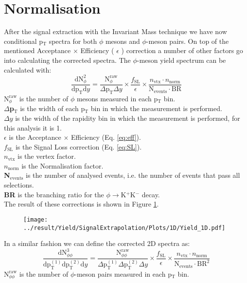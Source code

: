 \section{Normalisation}
\label{sec:Normalisation}
After the signal extraction with the Invariant Mass technique we have now conditional p$_{\text{T}}$ spectra for both $\phi$ mesons and $\phi$-meson pairs. On top of the mentioned Acceptance $\times$ Efficiency ( $\epsilon$ ) correction a number of other factors go into calculating the corrected spectra. The $\phi$-meson yield spectrum can be calculated with:
\begin{equation}
\frac{\text{dN}^2_{\phi}}{\text{dp}_{\text{T}}\text{d}y} = \frac{\text{N}_{\phi}^{\text{raw}}}{\Delta\text{p}_{\text{T}}\Delta y} \times \frac{f_{\text{SL}}}{\epsilon} \times \frac{n_{\text{vtx}}\cdot n_{\text{norm}}}{\text{N}_{\text{events}}\cdot \text{BR}}
\label{eq:1Dcorr}
\end{equation}
\textbf{$\text{N}_{\phi}^{\text{raw}}$} is the number of $\phi$ mesons measured in each p$_{\text{T}}$ bin.\\
\textbf{$\Delta$p$_{\text{T}}$} is the width of each p$_{\text{T}}$ bin in which the measurement is performed.\\
\textbf{$\Delta y$} is the width of the rapidity bin in which the measurement is performed, for this analysis it is 1.\\
\textbf{$\epsilon$} is the Acceptance $\times$ Efficiency (Eq. \ref{eq:eff}).\\
\textbf{$f_{\text{SL}}$} is the Signal Loss correction (Eq. \ref{eq:SL}).\\
\textbf{$n_{\text{vtx}}$} is the vertex factor.\\
\textbf{$n_{\text{norm}}$} is the Normalisation factor.\\
\textbf{N$_{\text{events}}$} is the number of analysed events, i.e. the number of events that pass all selections.\\
\textbf{BR} is the branching ratio for the $\phi \to$K$^+$K$^-$ decay.\\
\indent The result of these corrections is shown in Figure \ref{fig:spectrum1D}.

\begin{figure}
\centering
\texttt{[image: ../result/Yield/SignalExtrapolation/Plots/1D/Yield\_1D.pdf]}
\label{fig:spectrum1D}
\caption{}
\end{figure}

\indent In a similar fashion we can define the corrected 2D spectra as:
\begin{equation}
\frac{\text{dN}^3_{\phi\phi}}{\text{dp}^{(1)}_{\text{T}}\text{dp}^{(2)}_{\text{T}}\text{d}y} = \frac{\text{N}_{\phi\phi}^{\text{raw}}}{\Delta\text{p}^{(1)}_{\text{T}}\Delta\text{p}^{(2)}_{\text{T}}\Delta y} \times \frac{f_{\text{SL}}}{\epsilon} \times \frac{n_{\text{vtx}}\cdot n_{\text{norm}}}{\text{N}_{\text{events}}\cdot \text{BR}^2}
\label{eq:2Dcorr}
\end{equation}
\textbf{$\text{N}_{\phi\phi}^{\text{raw}}$} is the number of $\phi$-meson pairs measured in each p$_{\text{T}}$ bin.\\